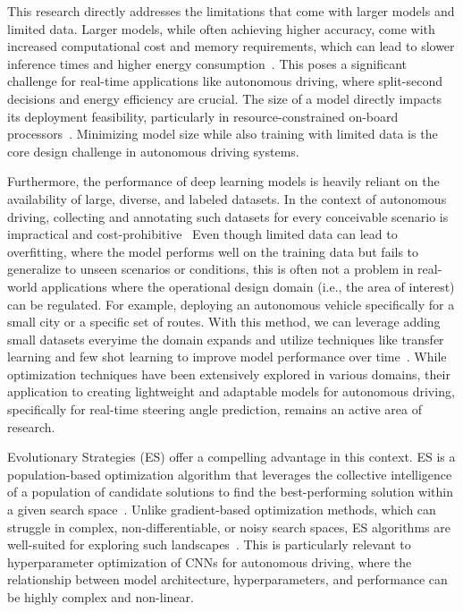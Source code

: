 \documentclass[conference]{IEEEtran}
\begin{document}
This research directly addresses the limitations that come with larger models and limited data. Larger models, while often achieving higher accuracy, come with increased computational cost and memory requirements, which can lead to slower inference times and higher energy consumption~\cite{self_drive_latency_and_model_size_drawbacks}. This poses a significant challenge for real-time applications like autonomous driving, where split-second decisions and energy efficiency are crucial. The size of a model directly impacts its deployment feasibility, particularly in resource-constrained on-board processors~\cite{MobileNET_size_and_speed}. Minimizing model size while also training with limited data is the core design challenge in autonomous driving systems.

Furthermore, the performance of deep learning models is heavily reliant on the availability of large, diverse, and labeled datasets. In the context of autonomous driving, collecting and annotating such datasets for every conceivable scenario is impractical and cost-prohibitive~\cite{ImageNET_large_scale_database} Even though limited data can lead to overfitting, where the model performs well on the training data but fails to generalize to unseen scenarios or conditions, this is often not a problem in real-world applications where the operational design domain (i.e., the area of interest) can be regulated. For example, deploying an autonomous vehicle specifically for a small city or a specific set of routes. With this method, we can leverage adding small datasets everyime the domain expands and utilize techniques like transfer learning and few shot learning to improve model performance over time~\cite{few_shot_learning}. While optimization techniques have been extensively explored in various domains, their application to creating lightweight and adaptable models for autonomous driving, specifically for real-time steering angle prediction, remains an active area of research.

Evolutionary Strategies (ES) offer a compelling advantage in this context. ES is a population-based optimization algorithm that leverages the collective intelligence of a population of candidate solutions to find the best-performing solution within a given search space~\cite{ES_introduction}. Unlike gradient-based optimization methods, which can struggle in complex, non-differentiable, or noisy search spaces, ES algorithms are well-suited for exploring such landscapes~\cite{ES_scalable}. This is particularly relevant to hyperparameter optimization of CNNs for autonomous driving, where the relationship between model architecture, hyperparameters, and performance can be highly complex and non-linear.
\end{document}
